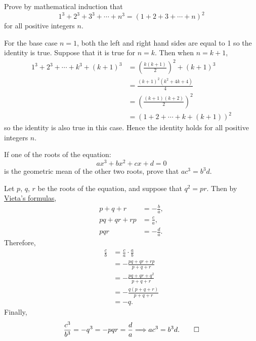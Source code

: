 \begin{question}
    Prove by mathematical induction that 
    \[1^3 + 2^3 + 3^3 + \cdots + n^3 =(1 + 2 + 3 + \cdots + n)^2\] 
    for all positive integers $n$. 
\end{question}
\begin{solution}
    For the base case $n = 1$, both the left and right hand sides are equal to
    1 so the identity is true. Suppose that it is true for $n = k$. Then when
    $n = k + 1$,
    \begin{align*}
        1^3 + 2^3 + \cdots + k^3 + (k + 1)^3 &= \left( \frac{k(k + 1)}{2} \right)^2 + (k + 1)^3\\
        &= \frac{(k + 1)^2(k^2 + 4k + 4)}{4}\\
        &= \left( \frac{(k + 1)(k + 2)}{2} \right)^2\\
        &= (1 + 2 + \cdots + k + (k + 1))^2
    \end{align*}
    so the identity is also true in this case. Hence the identity holds for all
    positive integers $n$.
\end{solution}

\begin{question}
    If one of the roots of the equation: \[ax^3 + bx^2 + cx + d = 0\] is the
    geometric mean of the other two roots, prove that $ac^3 = b^3d$.
\end{question}
\begin{solution}
    Let $p$, $q$, $r$ be the roots of the equation, and suppose that $q^2 =
    pr$. Then by \hyperref[thm: vieta]{Vieta's formulas},
    \begin{align*}
        p + q + r &= -\frac{b}{a},\\
        pq + qr + rp &= \frac{c}{a},\\
        pqr &= -\frac{d}{a}.
    \end{align*}
    Therefore, 
    \begin{align*}
        \frac{c}{b} &= \frac{c}{a} \cdot \frac{a}{b}\\
        &= -\frac{pq + qr + rp}{p + q + r}\\
        &= -\frac{pq + qr + q^2}{p + q + r}\\
        &= -\frac{q(p + q + r)}{p + q + r}\\
        &= -q.
    \end{align*}
    Finally,
    \[ \frac{c^3}{b^3} = -q^3 = -pqr = \frac{d}{a} \Longrightarrow ac^3 = b^3d. \qedhere \]
\end{solution}

